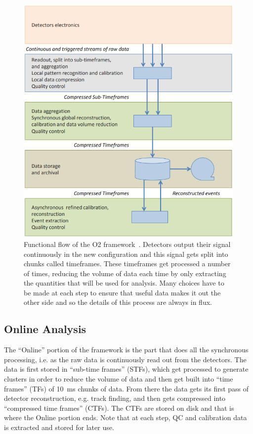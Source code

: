 \begin{figure}[h]
    \begin{center}
        \includegraphics[width=.6\textwidth]{Figs/O2_flow.png}
        \caption{Functional flow of the O2 framework~\cite{O2_Upgrade_TDR}. Detectors output their signal continuously in the new configuration and this signal gets split into chunks called timeframes. These timeframes get processed a number of times, reducing the volume of data each time by only extracting the quantities that will be used for analysis. Many choices have to be made at each step to ensure that useful data makes it out the other side and so the details of this process are always in flux.}
        \label{fig:O2_flow}
    \end{center}
\end{figure}

\subsection{Online Analysis}
The ``Online'' portion of the framework is the part that does all the synchronous processing, i.e. as the raw data is continuously read out from the detectors. The data is first stored in ``sub-time frames'' (STFs), which get processed to generate clusters in order to reduce the volume of data and then get built into ``time frames'' (TFs) of \SI{10}{\milli\second} chunks of data. From there the data gets its first pass of detector reconstruction, e.g. track finding, and then gets compressed into ``compressed time frames'' (CTFs). The CTFs are stored on disk and that is where the Online portion ends. Note that at each step, QC and calibration data is extracted and stored for later use.

